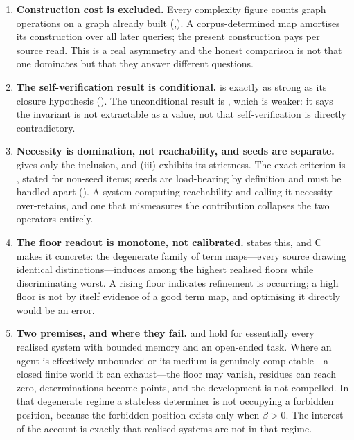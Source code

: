 \documentclass[11pt,twocolumn,a4paper]{article}
\theoremstyle{dirthm}
\theoremstyle{definition}
\theoremstyle{remark}
\newcommand{\flo}{\beta}
\begin{document}
\begin{enumerate}[leftmargin=1.6em,itemsep=2.5pt]
\item \textbf{Construction cost is excluded.} Every complexity figure counts
graph operations on a graph already built
(,). A corpus-determined map
amortises its construction over all later queries; the present construction
pays per source read. This is a real asymmetry and the honest comparison is
not that one dominates but that they answer different questions.

\item \textbf{The self-verification result is conditional.}
 is exactly as strong as its closure hypothesis
(). The unconditional result is
, which is weaker: it says the invariant is not
extractable as a value, not that self-verification is directly contradictory.

\item \textbf{Necessity is domination, not reachability, and seeds are
separate.}  gives only the inclusion, and
(iii) exhibits its strictness. The exact
criterion is , stated for non-seed items; seeds are
load-bearing by definition and must be handled apart
(). A system computing reachability and calling it
necessity over-retains, and one that mismeasures the contribution collapses
the two operators entirely.

\item \textbf{The floor readout is monotone, not calibrated.}
 states this, and C makes it
concrete: the degenerate family of term maps---every source drawing identical
distinctions---induces among the highest realised floors while discriminating
worst. A rising floor indicates refinement is occurring; a high floor is not
by itself evidence of a good term map, and optimising it directly would be an
error.

\item \textbf{Two premises, and where they fail.}  and
 hold for essentially every realised system with
bounded memory and an open-ended task. Where an agent is effectively unbounded
or its medium is genuinely completable---a closed finite world it can
exhaust---the floor may vanish, residues can reach zero, determinations become
points, and the development is not compelled. In that degenerate regime a
stateless determiner is not occupying a forbidden position, because the
forbidden position exists only when $\flo>0$. The interest of the account is
exactly that realised systems are not in that regime.
\end{enumerate}
\end{document}

